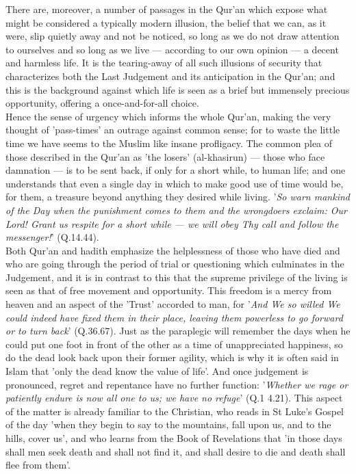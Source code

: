 \documentclass[10pt, twoside]{book}
\begin{document}
There are, moreover, a number of passages in the Qur'an which expose what might be considered a 
typically modern illusion, the belief that we can, as it were, slip quietly away and not be noticed, 
so long as we do not draw attention to ourselves and so long as we live --- according to our own 
opinion --- a decent and harmless life. It is the tearing\hyp{}away of all such illusions of security that 
characterizes both the Last Judgement and its anticipation in the Qur'an; and this is the background 
against which life is seen as a brief but immensely precious opportunity, offering a once\hyp{}and\hyp{}for\hyp{}all 
choice. \\

Hence the sense of urgency which informs the whole Qur'an, making the very thought of 'pass-times' an 
outrage against common sense; for to waste the little time we have seems to the Muslim like insane 
profligacy. The common plea of those described in the Qur'an as 'the losers' (al\hyp{}khasirun) --- those 
who face damnation --- is to be sent back, if only for a short while, to human life; and one 
understands that even a single day in which to make good use of time would be, for them, a treasure 
beyond anything they desired while living. '\emph{So warn mankind of the Day when the punishment comes to them and the wrongdoers exclaim: Our Lord! Grant us respite for a short while --- we will obey Thy call and follow the messenger!}' (Q.14.44). \\

Both Qur'an and hadith emphasize the helplessness of those who have died and who are going through 
the period of trial or questioning which culminates in the Judgement, and it is in contrast to this 
that the supreme privilege of the living is seen as that of free movement and opportunity. This 
freedom is a mercy from heaven and an aspect of the 'Trust' accorded to man, for '\emph{And We so willed We could indeed have fixed them in their place, leaving them powerless to go forward or to turn 
back}' (Q.36.67). Just as the paraplegic will remember the days when he could put one foot in front of 
the other as a time of unappreciated happiness, so do the dead look back upon their former agility, 
which is why it is often said in Islam that 'only the dead know the value of life'. And once 
judgement is pronounced, regret and repentance have no further function: '\emph{Whether we rage or 
patiently endure is now all one to us; we have no refuge}' (Q.1 4.21). This aspect of the matter is 
already familiar to the Christian, who reads in St Luke's Gospel of the day 'when they begin to say 
to the mountains, fall upon us, and to the hills, cover us', and who learns from the Book of 
Revelations that 'in those days shall men seek death and shall not find it, and shall desire to die 
and death shall flee from them'. \\
\end{document}
